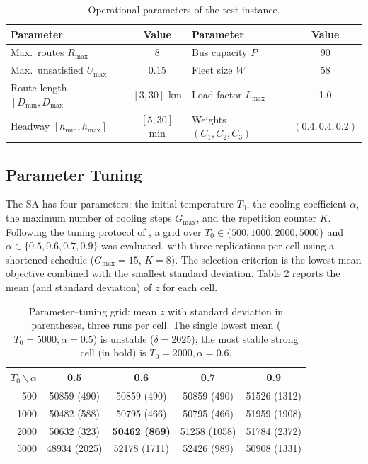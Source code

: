 \documentclass [a4paper, 11pt, titlepage] {article}
\begin{document}
\begin{table}[!htb]
  \centering
  \begin{tabular}{|l|c|l|c|}
    \hline
    Parameter & Value & Parameter & Value \\
    \hline
    Max.\ routes $R_{\max}$       & 8        & Bus capacity $P$       & 90 \\
    Max.\ unsatisfied $U_{\max}$  & 0.15     & Fleet size $W$         & 58 \\
    Route length $[D_{\min},D_{\max}]$ & $[3,30]$ km & Load factor $L_{\max}$ & 1.0 \\
    Headway $[h_{\min},h_{\max}]$ & $[5,30]$ min & Weights $(C_1,C_2,C_3)$ & $(0.4,0.4,0.2)$ \\
    \hline
  \end{tabular}
  \caption{Operational parameters of the test instance.}
  \label{tab:params}
\end{table}

\subsection{Parameter Tuning}
The SA has four parameters: the initial temperature $T_0$, the cooling
coefficient $\alpha$, the maximum number of cooling steps $G_{\max}$, and the
repetition counter $K$. Following the tuning protocol of \cite{fan2006}, a grid
over $T_0 \in \{500,1000,2000,5000\}$ and $\alpha \in \{0.5,0.6,0.7,0.9\}$ was
evaluated, with three replications per cell using a shortened schedule
($G_{\max}=15$, $K=8$). The selection criterion is the lowest mean objective
combined with the smallest standard deviation. Table \ref{tab:tuning} reports
the mean (and standard deviation) of $z$ for each cell.

\begin{table}[!htb]
  \centering
  \begin{tabular}{|r|c|c|c|c|}
    \hline
    $T_0 \backslash \alpha$ & 0.5 & 0.6 & 0.7 & 0.9 \\
    \hline
    500  & 50859 (490)  & 50859 (490)  & 50859 (490)  & 51526 (1312) \\
    1000 & 50482 (588)  & 50795 (466)  & 50795 (466)  & 51959 (1908) \\
    2000 & 50632 (323)  & \textbf{50462 (869)} & 51258 (1058) & 51784 (2372) \\
    5000 & 48934 (2025) & 52178 (1711) & 52426 (989)  & 50908 (1331) \\
    \hline
  \end{tabular}
  \caption{Parameter--tuning grid: mean $z$ with standard deviation in
  parentheses, three runs per cell. The single lowest mean
  ($T_0{=}5000,\alpha{=}0.5$) is unstable ($\delta=2025$); the most stable strong
  cell (in bold) is $T_0{=}2000,\alpha{=}0.6$.}
  \label{tab:tuning}
\end{table}
\end{document}
